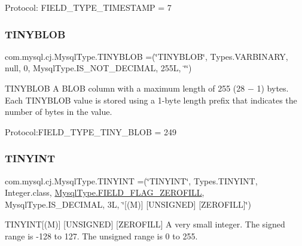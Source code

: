 Protocol\+: F\+I\+E\+L\+D\+\_\+\+T\+Y\+P\+E\+\_\+\+T\+I\+M\+E\+S\+T\+A\+MP = 7 \mbox{\label{enumcom_1_1mysql_1_1cj_1_1_mysql_type_a55c5e7d63a690905687b7fa55342dd9c}} 
\subsubsection{\texorpdfstring{T\+I\+N\+Y\+B\+L\+OB}{TINYBLOB}}
{\footnotesize\ttfamily com.\+mysql.\+cj.\+Mysql\+Type.\+T\+I\+N\+Y\+B\+L\+OB =(\char`\"{}T\+I\+N\+Y\+B\+L\+OB\char`\"{}, Types.\+V\+A\+R\+B\+I\+N\+A\+RY, null, 0, Mysql\+Type.\+I\+S\+\_\+\+N\+O\+T\+\_\+\+D\+E\+C\+I\+M\+AL, 255\+L, \char`\"{}\char`\"{})}

T\+I\+N\+Y\+B\+L\+OB A B\+L\+OB column with a maximum length of 255 (28 − 1) bytes. Each T\+I\+N\+Y\+B\+L\+OB value is stored using a 1-\/byte length prefix that indicates the number of bytes in the value.

Protocol\+:F\+I\+E\+L\+D\+\_\+\+T\+Y\+P\+E\+\_\+\+T\+I\+N\+Y\+\_\+\+B\+L\+OB = 249 \mbox{\label{enumcom_1_1mysql_1_1cj_1_1_mysql_type_a87adada40b706dcea9427e4cf5294ed8}} 
\subsubsection{\texorpdfstring{T\+I\+N\+Y\+I\+NT}{TINYINT}}
{\footnotesize\ttfamily com.\+mysql.\+cj.\+Mysql\+Type.\+T\+I\+N\+Y\+I\+NT =(\char`\"{}T\+I\+N\+Y\+I\+NT\char`\"{}, Types.\+T\+I\+N\+Y\+I\+NT, Integer.\+class, \mbox{\hyperlink{enumcom_1_1mysql_1_1cj_1_1_mysql_type_abb76a1f2f3dac9a30d1b559b8ba66a48}{Mysql\+Type.\+F\+I\+E\+L\+D\+\_\+\+F\+L\+A\+G\+\_\+\+Z\+E\+R\+O\+F\+I\+LL}}, Mysql\+Type.\+I\+S\+\_\+\+D\+E\+C\+I\+M\+AL, 3\+L, \char`\"{}\mbox{[}(\+M)\mbox{]} \mbox{[}\+U\+N\+S\+I\+G\+N\+E\+D\mbox{]} \mbox{[}\+Z\+E\+R\+O\+F\+I\+L\+L\mbox{]}\char`\"{})}

T\+I\+N\+Y\+I\+NT\mbox{[}(M)\mbox{]} \mbox{[}U\+N\+S\+I\+G\+N\+ED\mbox{]} \mbox{[}Z\+E\+R\+O\+F\+I\+LL\mbox{]} A very small integer. The signed range is -\/128 to 127. The unsigned range is 0 to 255.

